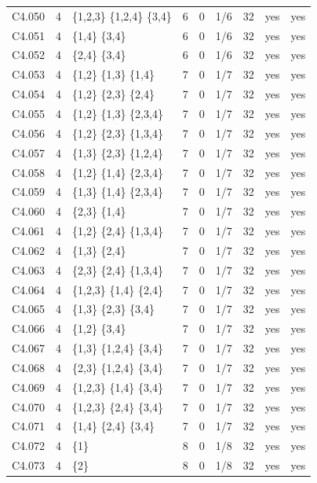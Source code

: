 {\begin{longtable}{@{}llp{6.2cm}rllrll@{}}
C4.050 & 4 & \{1,2,3\} \{1,2,4\} \{3,4\} & 6 & 0 & 1/6 & 32 & yes & yes \\
C4.051 & 4 & \{1,4\} \{3,4\} & 6 & 0 & 1/6 & 32 & yes & yes \\
C4.052 & 4 & \{2,4\} \{3,4\} & 6 & 0 & 1/6 & 32 & yes & yes \\
C4.053 & 4 & \{1,2\} \{1,3\} \{1,4\} & 7 & 0 & 1/7 & 32 & yes & yes \\
C4.054 & 4 & \{1,2\} \{2,3\} \{2,4\} & 7 & 0 & 1/7 & 32 & yes & yes \\
C4.055 & 4 & \{1,2\} \{1,3\} \{2,3,4\} & 7 & 0 & 1/7 & 32 & yes & yes \\
C4.056 & 4 & \{1,2\} \{2,3\} \{1,3,4\} & 7 & 0 & 1/7 & 32 & yes & yes \\
C4.057 & 4 & \{1,3\} \{2,3\} \{1,2,4\} & 7 & 0 & 1/7 & 32 & yes & yes \\
C4.058 & 4 & \{1,2\} \{1,4\} \{2,3,4\} & 7 & 0 & 1/7 & 32 & yes & yes \\
C4.059 & 4 & \{1,3\} \{1,4\} \{2,3,4\} & 7 & 0 & 1/7 & 32 & yes & yes \\
C4.060 & 4 & \{2,3\} \{1,4\} & 7 & 0 & 1/7 & 32 & yes & yes \\
C4.061 & 4 & \{1,2\} \{2,4\} \{1,3,4\} & 7 & 0 & 1/7 & 32 & yes & yes \\
C4.062 & 4 & \{1,3\} \{2,4\} & 7 & 0 & 1/7 & 32 & yes & yes \\
C4.063 & 4 & \{2,3\} \{2,4\} \{1,3,4\} & 7 & 0 & 1/7 & 32 & yes & yes \\
C4.064 & 4 & \{1,2,3\} \{1,4\} \{2,4\} & 7 & 0 & 1/7 & 32 & yes & yes \\
C4.065 & 4 & \{1,3\} \{2,3\} \{3,4\} & 7 & 0 & 1/7 & 32 & yes & yes \\
C4.066 & 4 & \{1,2\} \{3,4\} & 7 & 0 & 1/7 & 32 & yes & yes \\
C4.067 & 4 & \{1,3\} \{1,2,4\} \{3,4\} & 7 & 0 & 1/7 & 32 & yes & yes \\
C4.068 & 4 & \{2,3\} \{1,2,4\} \{3,4\} & 7 & 0 & 1/7 & 32 & yes & yes \\
C4.069 & 4 & \{1,2,3\} \{1,4\} \{3,4\} & 7 & 0 & 1/7 & 32 & yes & yes \\
C4.070 & 4 & \{1,2,3\} \{2,4\} \{3,4\} & 7 & 0 & 1/7 & 32 & yes & yes \\
C4.071 & 4 & \{1,4\} \{2,4\} \{3,4\} & 7 & 0 & 1/7 & 32 & yes & yes \\
C4.072 & 4 & \{1\} & 8 & 0 & 1/8 & 32 & yes & yes \\
C4.073 & 4 & \{2\} & 8 & 0 & 1/8 & 32 & yes & yes \\

\end{longtable}}
